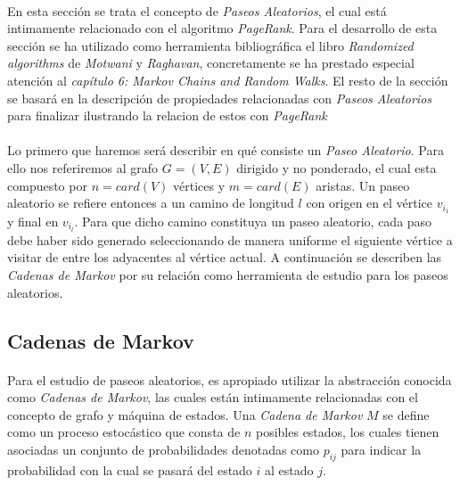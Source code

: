 \documentclass{subfiles}
\begin{document}
      \paragraph{}
      En esta sección se trata el concepto de \emph{Paseos Aleatorios}, el cual está intimamente relacionado con el algoritmo \emph{PageRank}. Para el desarrollo de esta sección se ha utilizado como herramienta bibliográfica el libro \emph{Randomized algorithms} \cite{motwani2010randomized} de \emph{Motwani} y \emph{Raghavan}, concretamente se ha prestado especial atención al \emph{capítulo 6: Markov Chains and Random Walks}. El resto de la sección se basará en la descripción de propiedades relacionadas con \emph{Paseos Aleatorios} para finalizar ilustrando la relacion de estos con \emph{PageRank}

      \paragraph{}
      Lo primero que haremos será describir en qué consiste un \emph{Paseo Aleatorio}. Para ello nos referiremos al grafo $G=(V,E)$ dirigido y no ponderado, el cual esta compuesto por $n = card(V)$ vértices y $m=card(E)$ aristas. Un paseo aleatorio se refiere entonces a un camino de longitud $l$ con origen en el vértice $v_{i_1}$ y final en $v_{i_l}$. Para que dicho camino constituya un paseo aleatorio, cada paso debe haber sido generado seleccionando de manera uniforme el siguiente vértice a visitar de entre los adyacentes al vértice actual. A continuación se describen las \emph{Cadenas de Markov} por su relación como herramienta de estudio para los paseos aleatorios.


      \subsection{Cadenas de Markov}
      \label{sec:markov_chains}

        \paragraph{}
        Para el estudio de paseos aleatorios, es apropiado utilizar la abstracción conocida como \emph{Cadenas de Markov}, las cuales están intimamente relacionadas con el concepto de grafo y máquina de estados. Una \emph{Cadena de Markov} $M$ se define como un proceso estocástico que consta de $n$ posibles estados, los cuales tienen asociadas un conjunto de probabilidades denotadas como $p_{ij}$ para indicar la probabilidad con la cual se pasará del estado $i$ al estado $j$.
\end{document}
